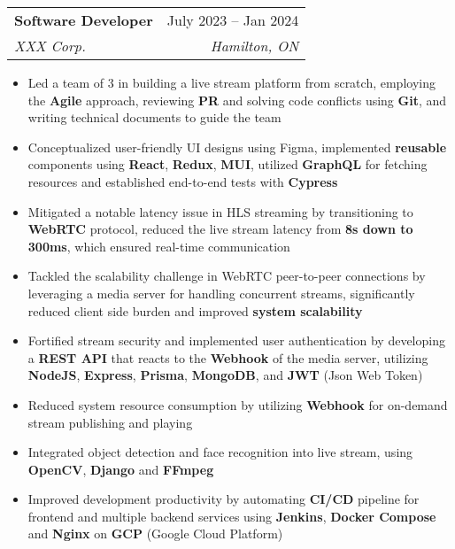 \documentclass[letterpaper,11pt]{article}
\makeatletter
\newcommand{\resumeItem}[1]{
  \item\small{
    {#1 \vspace{-2pt}}
  }
}
\newcommand{\resumeSubheading}[4]{
  \vspace{-2pt}\item
    \begin{tabular*}{0.97\textwidth}[t]{l@{\extracolsep{\fill}}r}
      \textbf{#1} & #2 \\
      \textit{\small#3} & \textit{\small #4} \\
    \end{tabular*}\vspace{-7pt}
}
\newcommand{\resumeItemListStart}{\begin{itemize}}
\newcommand{\resumeItemListEnd}{\end{itemize}\vspace{-5pt}}
\makeatother
\begin{document}
    \resumeSubheading
      {Software Developer}{July 2023 -- Jan 2024}
      {XXX Corp.}{Hamilton, ON}
      \resumeItemListStart
        \resumeItem{Led a team of 3 in building a live stream platform from scratch, employing the \textbf{Agile} approach, reviewing \textbf{PR} and solving code conflicts using \textbf{Git}, and writing technical documents to guide the team}
        \resumeItem{Conceptualized user-friendly UI designs using Figma, implemented \textbf{reusable} components using \textbf{React}, \textbf{Redux}, \textbf{MUI}, utilized \textbf{GraphQL} for fetching resources and established end-to-end tests with \textbf{Cypress}}
        \resumeItem{Mitigated a notable latency issue in HLS streaming by transitioning to \textbf{WebRTC} protocol, reduced the live stream latency from \textbf{8s down to 300ms}, which ensured real-time communication}
        \resumeItem{Tackled the scalability challenge in WebRTC peer-to-peer connections by leveraging a media server for handling concurrent streams, significantly reduced client side burden and improved \textbf{system scalability}}
        \resumeItem{Fortified stream security and implemented user authentication by developing a \textbf{REST API} that reacts to the \textbf{Webhook} of the media server, utilizing \textbf{NodeJS}, \textbf{Express}, \textbf{Prisma}, \textbf{MongoDB}, and \textbf{JWT} (Json Web Token)}
        \resumeItem{Reduced system resource consumption by utilizing \textbf{Webhook} for on-demand stream publishing and playing}
        \resumeItem{Integrated object detection and face recognition into live stream, using \textbf{OpenCV}, \textbf{Django} and \textbf{FFmpeg}}
        \resumeItem{Improved development productivity by automating \textbf{CI/CD} pipeline for frontend and multiple backend services using \textbf{Jenkins}, \textbf{Docker Compose} and \textbf{Nginx} on \textbf{GCP} (Google Cloud Platform)}
    \resumeItemListEnd
\end{document}
